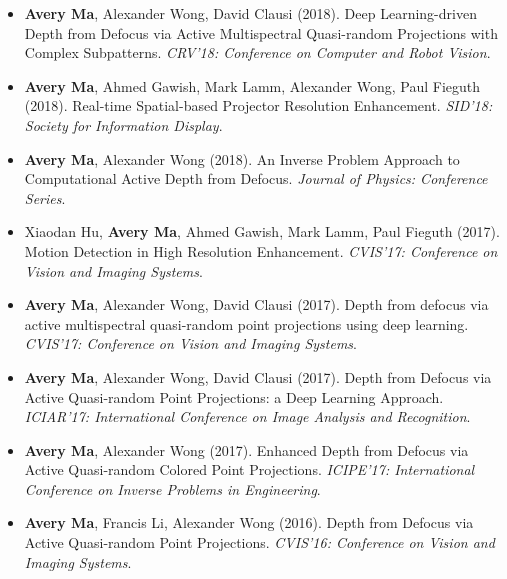 \begin{adjustwidth}{\indentleft}{\indentright}
\begin{itemize}
            \item \textbf{Avery Ma}, Alexander Wong, David Clausi (2018). Deep Learning-driven Depth from Defocus via Active Multispectral Quasi-random Projections with Complex Subpatterns. \emph{CRV'18: Conference on Computer and Robot Vision}.
            
            \item \textbf{Avery Ma}, Ahmed Gawish, Mark Lamm, Alexander Wong, Paul Fieguth (2018). Real-time Spatial-based Projector Resolution Enhancement. \emph{SID'18: Society for Information Display}.
            
            \item \textbf{Avery Ma}, Alexander Wong (2018). An Inverse Problem Approach to Computational Active Depth from Defocus. \emph{Journal of Physics: Conference Series}.
            
            \item Xiaodan Hu, \textbf{Avery Ma}, Ahmed Gawish, Mark Lamm, Paul Fieguth (2017). Motion Detection in High Resolution Enhancement. \emph{CVIS'17: Conference on Vision and Imaging Systems}.
            
            \item \textbf{Avery Ma}, Alexander Wong, David Clausi (2017). Depth from defocus via active multispectral quasi-random point projections using deep learning. \emph{CVIS'17: Conference on Vision and Imaging Systems}.
            
            \item \textbf{Avery Ma}, Alexander Wong, David Clausi (2017). Depth from Defocus via Active Quasi-random Point Projections: a Deep Learning Approach. \emph{ICIAR'17: International Conference on Image Analysis and Recognition}.
            
            \item \textbf{Avery Ma}, Alexander Wong (2017). Enhanced Depth from Defocus via Active Quasi-random Colored Point Projections. \emph{ICIPE'17: International Conference on Inverse Problems in Engineering}.
                   
            \item \textbf{Avery Ma}, Francis Li, Alexander Wong (2016). Depth from Defocus via Active Quasi-random Point Projections. \emph{CVIS'16: Conference on Vision and Imaging Systems}.
       
        \end{itemize}
        \hfill
        
        
 
        
    \end{adjustwidth}
